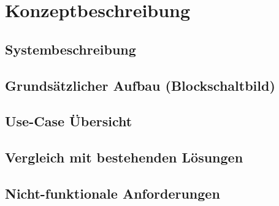 \section{Konzeptbeschreibung}

\subsection{Systembeschreibung}

\subsection{Grundsätzlicher Aufbau (Blockschaltbild)}

\subsection{Use-Case Übersicht}

\subsection{Vergleich mit bestehenden Lösungen}

\subsection{Nicht-funktionale Anforderungen}